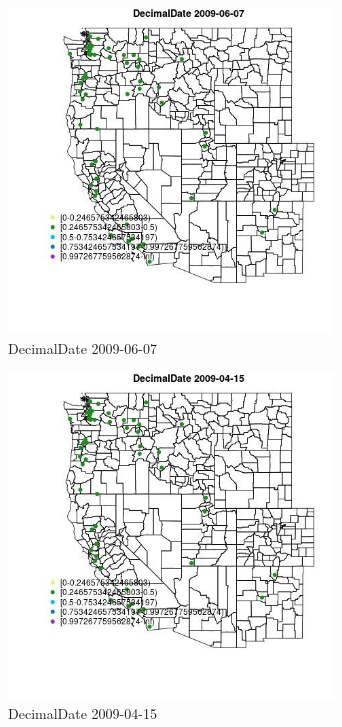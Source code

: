 \begin{figure} 
\centering  
\includegraphics[width=0.77\textwidth]{Code_Outputs/Report_ML_input_PM25_Step4_part_e_de_duplicated_aves_MapObsDecimalDate2009-06-07.jpg} 
\caption{\label{fig:Report_ML_input_PM25_Step4_part_e_de_duplicated_avesMapObsDecimalDate2009-06-07}DecimalDate 2009-06-07} 
\end{figure} 
 

\begin{figure} 
\centering  
\includegraphics[width=0.77\textwidth]{Code_Outputs/Report_ML_input_PM25_Step4_part_e_de_duplicated_aves_MapObsDecimalDate2009-04-15.jpg} 
\caption{\label{fig:Report_ML_input_PM25_Step4_part_e_de_duplicated_avesMapObsDecimalDate2009-04-15}DecimalDate 2009-04-15} 
\end{figure} 
 
